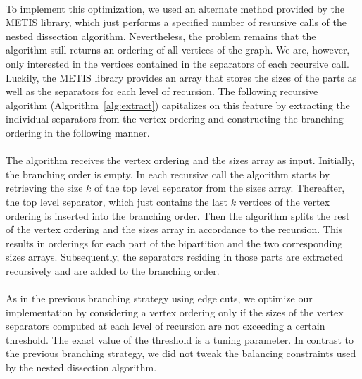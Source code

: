 \documentclass[12pt,a4paper,twoside]{scrartcl}
\numberwithin{equation}{section}
\begin{document}
\paragraph{}
To implement this optimization, we used an alternate method provided by the METIS library, which just performs a specified number of resursive calls of the nested dissection algorithm. Nevertheless, the problem remains that the algorithm still returns an ordering of all vertices of the graph. We are, however, only interested in the vertices contained in the separators of each recursive call. Luckily, the METIS library provides an array that stores the sizes of the parts as well as the separators for each level of recursion. The following recursive algorithm (Algorithm~\ref{alg:extract}) capitalizes on this feature by extracting the individual separators from the vertex ordering and constructing the branching ordering in the following manner.

\paragraph{}
The algorithm receives the vertex ordering and the sizes array as input. Initially, the branching order is empty. In each recursive call the algorithm starts by retrieving the size $k$ of the top level separator from the sizes array. Thereafter, the top level separator, which just contains the last $k$ vertices of the vertex ordering is inserted into the branching order. Then the algorithm splits the rest of the vertex ordering and the sizes array in accordance to the recursion. This results in orderings for each part of the bipartition and the two corresponding sizes arrays. Subsequently, the separators residing in those parts are extracted recursively and are added to the branching order.
\paragraph{}
As in the previous branching strategy using edge cuts, we optimize our implementation by considering a vertex ordering only if the sizes of the vertex separators computed at each level of recursion are not exceeding a certain threshold. The exact value of the threshold is a tuning parameter. In contrast to the previous branching strategy, we did not tweak the balancing constraints used by the nested dissection algorithm. 
\end{document}

